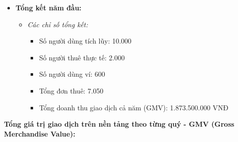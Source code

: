 \begin{itemize}
\begin{itemize}
\begin{itemize}
            \item Tổng giá trị giao dịch trên nền tảng: 1.192.500.000 VNĐ
            \item Tổng giao dịch nhờ mở ví: 3.000.000 VNĐ
            \item Tổng giao dịch quý (GMV): 1.195.500.000 VNĐ
        \end{itemize}
    \end{itemize}
    \item \textbf{Tổng kết năm đầu:}
    \begin{itemize}
        \item \textit{Các chỉ số tổng kết:}
        \begin{itemize}
            \item Số người dùng tích lũy: 10.000
            \item Số người thuê thực tế: 2.000
            \item Số người dùng ví: 600
            \item Tổng đơn thuê: 7.050
            \item Tổng doanh thu giao dịch cả năm (GMV): 1.873.500.000 VNĐ
        \end{itemize}
    \end{itemize}
\end{itemize}
 
\textbf{Tổng giá trị giao dịch trên nền tảng theo từng quý - GMV (Gross Merchandise Value):}

\begin{table}[htbp]
    \centering
    \caption{Tổng giá trị giao dịch theo từng quý (GMV)}
\end{table}


